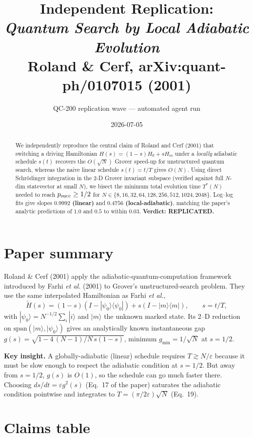 \documentclass[11pt]{article}
\title{Independent Replication: \\
\emph{Quantum Search by Local Adiabatic Evolution} \\
{\normalsize Roland \& Cerf, arXiv:quant-ph/0107015 (2001)}}
\author{QC-200 replication wave — automated agent run}
\date{2026-07-05}
\begin{document}
\maketitle

\begin{abstract}
We independently reproduce the central claim of Roland and Cerf (2001) that
switching a driving Hamiltonian $H(s)=(1{-}s)H_0+sH_m$ under a \emph{locally}
adiabatic schedule $s(t)$ recovers the $O(\sqrt N)$ Grover speed-up for
unstructured quantum search, whereas the naive linear schedule $s(t)=t/T$ gives
$O(N)$. Using direct Schr\"odinger integration in the 2-D Grover invariant
subspace (verified against full $N$-dim statevector at small $N$), we bisect the
minimum total evolution time $T^{\ast}(N)$ needed to reach $p_{\rm succ}\ge 1/2$
for $N\in\{8,16,32,64,128,256,512,1024,2048\}$. Log--log fits give slopes
\textbf{$0.9992$ (linear)} and \textbf{$0.4756$ (local-adiabatic)}, matching the
paper's analytic predictions of $1.0$ and $0.5$ to within $0.03$.
\textbf{Verdict: REPLICATED.}
\end{abstract}

\section{Paper summary}

Roland \& Cerf (2001) apply the adiabatic-quantum-computation framework
introduced by Farhi \emph{et al.} (2001) to Grover's unstructured-search
problem. They use the same interpolated Hamiltonian as Farhi \emph{et al.},
\[
  \tilde H(s)=(1-s)(I-|\psi_0\rangle\langle\psi_0|)+s(I-|m\rangle\langle m|),
  \qquad s=t/T,
\]
with $|\psi_0\rangle=N^{-1/2}\sum_i|i\rangle$ and $|m\rangle$ the unknown
marked state. Its 2--D reduction on $\mathrm{span}(|m\rangle,|\psi_0\rangle)$
gives an analytically known instantaneous gap
$g(s)=\sqrt{1-4\,(N-1)/N\,s(1-s)}$, minimum $g_{\min}=1/\sqrt N$ at $s=1/2$.

\medskip\noindent\textbf{Key insight.} A globally-adiabatic (linear) schedule
requires $T\gtrsim N/\varepsilon$ because it must be slow enough to respect the
adiabatic condition at $s=1/2$. But away from $s=1/2$, $g(s)$ is $O(1)$, so
the schedule can go much faster there. Choosing
$ds/dt=\varepsilon g^2(s)$ (Eq.~17 of the paper) saturates the adiabatic
condition pointwise and integrates to
$T=(\pi/2\varepsilon)\sqrt N$ (Eq.~19).

\section{Claims table}
\end{document}

